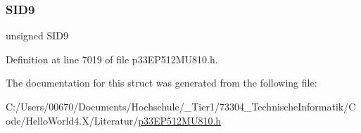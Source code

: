 \subsubsection{\texorpdfstring{S\+I\+D9}{SID9}}
{\footnotesize\ttfamily unsigned S\+I\+D9}



Definition at line 7019 of file p33\+E\+P512\+M\+U810.\+h.



The documentation for this struct was generated from the following file\+:\begin{DoxyCompactItemize}
\item 
C\+:/\+Users/00670/\+Documents/\+Hochschule/\+\_\+\+Tier1/73304\+\_\+\+Technische\+Informatik/\+Code/\+Hello\+World4.\+X/\+Literatur/\hyperlink{p33_e_p512_m_u810_8h}{p33\+E\+P512\+M\+U810.\+h}\end{DoxyCompactItemize}
